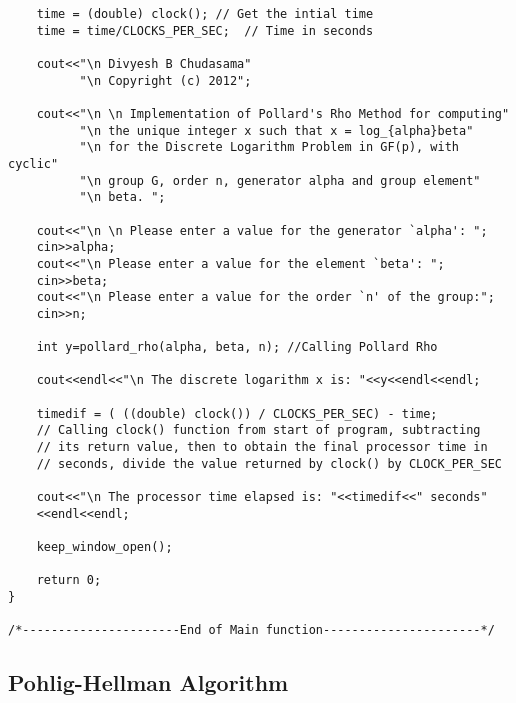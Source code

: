 \documentclass[iwp,first]{luthesis}
\begin{document}
\begin{verbatim}
    time = (double) clock(); // Get the intial time
    time = time/CLOCKS_PER_SEC;  // Time in seconds 
    
    cout<<"\n Divyesh B Chudasama"
          "\n Copyright (c) 2012";
    
    cout<<"\n \n Implementation of Pollard's Rho Method for computing" 
          "\n the unique integer x such that x = log_{alpha}beta" 
          "\n for the Discrete Logarithm Problem in GF(p), with cyclic" 
          "\n group G, order n, generator alpha and group element" 
          "\n beta. ";
              
    cout<<"\n \n Please enter a value for the generator `alpha': ";
    cin>>alpha;
    cout<<"\n Please enter a value for the element `beta': ";
    cin>>beta;
    cout<<"\n Please enter a value for the order `n' of the group:";
    cin>>n;
    
    int y=pollard_rho(alpha, beta, n); //Calling Pollard Rho
    
    cout<<endl<<"\n The discrete logarithm x is: "<<y<<endl<<endl;
    
    timedif = ( ((double) clock()) / CLOCKS_PER_SEC) - time; 
    // Calling clock() function from start of program, subtracting 
    // its return value, then to obtain the final processor time in 
    // seconds, divide the value returned by clock() by CLOCK_PER_SEC
    
    cout<<"\n The processor time elapsed is: "<<timedif<<" seconds"
    <<endl<<endl;
    
    keep_window_open();
    
    return 0;
}       

/*----------------------End of Main function----------------------*/

\end{verbatim}





\subsection{Pohlig-Hellman Algorithm}
\end{document}
